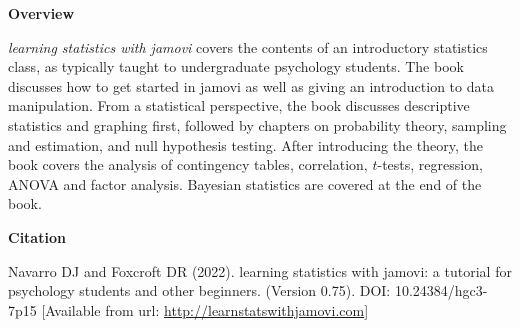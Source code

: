

\clearpage
\newpage
\begin{center}
{\bf Overview}
\end{center}

\noindent
{\it learning statistics with jamovi} covers the contents of an introductory statistics class, as typically taught to undergraduate psychology students. The book discusses how to get started in jamovi as well as giving an introduction to data manipulation. From a statistical perspective, the book discusses descriptive statistics and graphing first, followed by chapters on probability theory, sampling and estimation, and null hypothesis testing. After introducing the theory, the book covers the analysis of contingency tables, correlation, $t$-tests, regression, ANOVA and factor analysis. Bayesian statistics are covered at the end of the book. 

\vspace{14cm}
\begin{center}
{\bf Citation}
\end{center}

\noindent
Navarro DJ and Foxcroft DR (2022). learning statistics with jamovi: a tutorial for psychology students and other beginners. (Version 0.75). DOI: 10.24384/hgc3-7p15 [Available from url: \url{http://learnstatswithjamovi.com}]